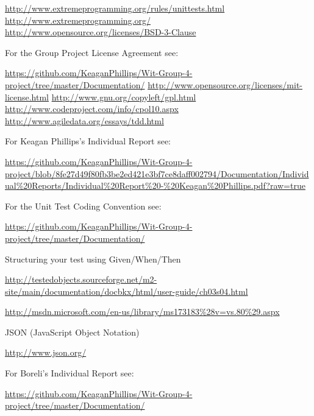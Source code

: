 \documentclass[a4paper,12pt]{article}
\begin{document}
\clearpage
\begin{thebibliography}{5}
 \url{http://www.extremeprogramming.org/rules/unittests.html}
 \url{http://www.extremeprogramming.org/}
 \url{http://www.opensource.org/licenses/BSD-3-Clause}
  \begin{flushleft}
For the Group Project License Agreement see: 
\end{flushleft} \url{https://github.com/KeaganPhillips/Wit-Group-4-project/tree/master/Documentation/}
 \url{http://www.opensource.org/licenses/mit-license.html}
 \url{http://www.gnu.org/copyleft/gpl.html}
 \url{http://www.codeproject.com/info/cpol10.aspx}
 \url{http://www.agiledata.org/essays/tdd.html}
 \begin{flushleft}
For Keagan Phillips's Individual Report see: 
\end{flushleft}\url{https://github.com/KeaganPhillips/Wit-Group-4-project/blob/8fe27d49f80fb3be2ed421e3bf7ce8daff002794/Documentation/Individual%20Reports/Individual%20Report%20-%20Keagan%20Phillips.pdf?raw=true}

 \begin{flushleft}
For the Unit Test Coding Convention see:
\end{flushleft} \url{https://github.com/KeaganPhillips/Wit-Group-4-project/tree/master/Documentation/}

 \begin{flushleft}
Structuring your test using Given/When/Then
\end{flushleft} \url{http://testedobjects.sourceforge.net/m2-site/main/documentation/docbkx/html/user-guide/ch03s04.html}

 \url{http://msdn.microsoft.com/en-us/library/ms173183%28v=vs.80%29.aspx}


 \begin{flushleft}
JSON (JavaScript Object Notation)
\end{flushleft} \url{http://www.json.org/}

 \begin{flushleft}
For Boreli's Individual Report see:   
\end{flushleft} \url{https://github.com/KeaganPhillips/Wit-Group-4-project/tree/master/Documentation/}


\end{thebibliography}
\end{document}
